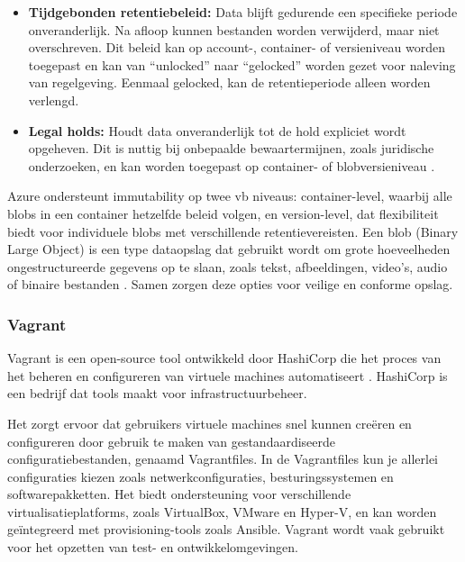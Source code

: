 \begin{itemize}[leftmargin=1cm]
    \item \textbf{Tijdgebonden retentiebeleid:} Data blijft gedurende een specifieke periode onveranderlijk. Na afloop kunnen bestanden worden verwijderd, maar niet overschreven. Dit beleid kan op account-, container- of versieniveau worden toegepast en kan van ``unlocked'' naar ``gelocked'' worden gezet voor naleving van regelgeving. Eenmaal gelocked, kan de retentieperiode alleen worden verlengd.
    \item \textbf{Legal holds:} Houdt data onveranderlijk tot de hold expliciet wordt opgeheven. Dit is nuttig bij onbepaalde bewaartermijnen, zoals juridische onderzoeken, en kan worden toegepast op container- of blobversieniveau \autocite{Estabrook2024}.
\end{itemize}
Azure ondersteunt immutability op twee vb niveaus: container-level, waarbij alle blobs in een container hetzelfde beleid volgen, en version-level, dat flexibiliteit biedt voor individuele blobs met verschillende retentievereisten. Een blob (Binary Large Object) is een type dataopslag dat gebruikt wordt om grote hoeveelheden ongestructureerde gegevens op te slaan, zoals tekst, afbeeldingen, video's, audio of binaire bestanden \autocite{Kemp2007}. Samen zorgen deze opties voor veilige en conforme opslag.



\subsubsection{Vagrant}
Vagrant is een open-source tool ontwikkeld door HashiCorp die het proces van het beheren en configureren van virtuele machines automatiseert \autocite{Hashicorp}. HashiCorp is een bedrijf dat tools maakt voor infrastructuurbeheer. 

Het zorgt ervoor dat gebruikers virtuele machines snel kunnen creëren en configureren door gebruik te maken van gestandaardiseerde configuratiebestanden, genaamd Vagrantfiles. In de Vagrantfiles kun je allerlei configuraties kiezen zoals netwerkconfiguraties, besturingssystemen en softwarepakketten. Het biedt ondersteuning voor verschillende virtualisatieplatforms, zoals VirtualBox, VMware en Hyper-V, en kan worden geïntegreerd met provisioning-tools zoals Ansible. Vagrant wordt vaak gebruikt voor het opzetten van test- en ontwikkelomgevingen.


